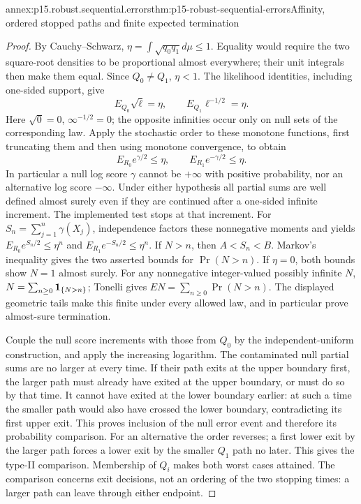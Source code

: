 \begin{annexitem}{annex:p15.robust.sequential.errors}{thm:p15-robust-sequential-errors}{Affinity, ordered stopped paths and finite expected termination}
\begin{proof}
By Cauchy--Schwarz,
\(\eta=\int\sqrt{q_0q_1}d\mu\leq1\).
Equality would require the two square-root densities to be proportional
almost everywhere; their unit integrals then make them equal.
Since \(Q_0\ne Q_1\), \(\eta<1\).
The likelihood identities, including one-sided support, give
\[
 E_{Q_0}\sqrt\ell=\eta,\qquad E_{Q_1}\ell^{-1/2}=\eta.
\]
Here \(\sqrt0=0\), \(\infty^{-1/2}=0\); the opposite infinities occur
only on null sets of the corresponding law.
Apply the stochastic order to these monotone functions, first truncating
them and then using monotone convergence, to obtain
\[
 E_{R_0}e^{\gamma/2}\leq\eta,\qquad
 E_{R_1}e^{-\gamma/2}\leq\eta.
\]
In particular a null log score \(\gamma\) cannot be \(+\infty\) with positive
probability, nor an alternative log score \(-\infty\).
Under either hypothesis all partial sums are well defined almost
surely even if they are continued after a one-sided infinite increment.
The implemented test stops at that increment.
For \(S_n=\sum_{j=1}^n\gamma(X_j)\), independence factors these
nonnegative moments and yields
\(E_{R_0}e^{S_n/2}\leq\eta^n\) and
\(E_{R_1}e^{-S_n/2}\leq\eta^n\).
If \(N>n\), then \(A<S_n<B\).
Markov's inequality gives the two asserted bounds for \(\Pr(N>n)\).
If \(\eta=0\), both bounds show \(N=1\) almost surely.
For any nonnegative integer-valued possibly infinite \(N\),
\(N=\sum_{n\geq0}{\bf1}_{\{N>n\}}\); Tonelli gives
\(EN=\sum_{n\geq0}\Pr(N>n)\).
The displayed geometric tails make this finite under every allowed law,
and in particular prove almost-sure termination.

Couple the null score increments with those from \(Q_0\) by the
independent-uniform construction, and apply the increasing logarithm.
The contaminated null partial sums are no larger at every time.
If their path exits at the upper boundary first, the larger path
must already have exited at the upper boundary, or must do so by
that time. It cannot have exited at the lower boundary earlier:
at such a time the smaller path would also have crossed the lower
boundary, contradicting its first upper exit.
This proves inclusion of the null error event and therefore its
probability comparison.
For an alternative the order reverses; a first lower exit by the
larger path forces a lower exit by the smaller \(Q_1\) path no later.
This gives the type-II comparison. Membership of \(Q_i\) makes both
worst cases attained.
The comparison concerns exit decisions, not an ordering of the two
stopping times: a larger path can leave through either endpoint.
\end{proof}
\end{annexitem}

